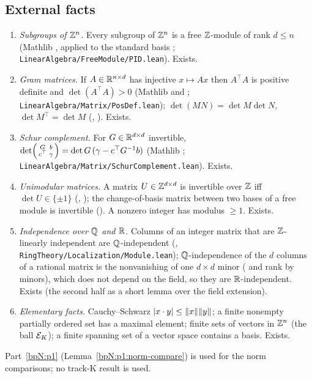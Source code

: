 \subsection{External facts}\label{bpN:p8:s-ext}
\begin{enumerate}[label=(E\arabic*),leftmargin=2.2em]
\item\label{bpN:p8:ext-free} \emph{Subgroups of $\mathbb{Z}^n$.} Every subgroup of $\mathbb{Z}^n$ is a free $\mathbb{Z}$-module of rank $d\le n$ (Mathlib , applied to the standard basis ; \texttt{LinearAlgebra/FreeModule/PID.lean}). Exists.
\item\label{bpN:p8:ext-gram} \emph{Gram matrices.} If $A\in\mathbb{R}^{n\times d}$ has injective $x\mapsto Ax$ then $A^\top A$ is positive definite and $\det(A^\top A)>0$ (Mathlib  and ; \texttt{LinearAlgebra/Matrix/PosDef.lean}); $\det(MN)=\det M\det N$, $\det M^\top=\det M$ (, ). Exists.
\item\label{bpN:p8:ext-schur} \emph{Schur complement.} For $G\in\mathbb{R}^{d\times d}$ invertible, $\det\begin{psmallmatrix}G&b\\c^\top&\gamma\end{psmallmatrix}=\det G\,(\gamma-c^\top G^{-1}b)$ (Mathlib ; \texttt{LinearAlgebra/Matrix/SchurComplement.lean}). Exists.
\item\label{bpN:p8:ext-units} \emph{Unimodular matrices.} A matrix $U\in\mathbb{Z}^{d\times d}$ is invertible over $\mathbb{Z}$ iff $\det U\in\{\pm1\}$ (, ); the change-of-basis matrix between two bases of a free module is invertible (). A nonzero integer has modulus $\ge1$. Exists.
\item\label{bpN:p8:ext-indep} \emph{Independence over $\mathbb Q$ and $\mathbb{R}$.} Columns of an integer matrix that are $\mathbb{Z}$-linearly independent are $\mathbb Q$-independent (, \texttt{RingTheory/Localization/Module.lean}); $\mathbb Q$-independence of the $d$ columns of a rational matrix is the nonvanishing of one $d\times d$ minor ( and rank by minors), which does not depend on the field, so they are $\mathbb{R}$-independent. Exists (the second half as a short lemma over the field extension).
\item\label{bpN:p8:ext-basic} \emph{Elementary facts.} Cauchy--Schwarz $\lvert x\cdot y\rvert\le\lVert x\rVert\lVert y\rVert$; a finite nonempty partially ordered set has a maximal element; finite sets of vectors in $\mathbb{Z}^n$ (the ball $\mathcal E_K$); a finite spanning set of a vector space contains a basis. Exists.
\end{enumerate}
Part~\ref{bpN:p1} (Lemma~\ref{bpN:p1:norm-compare}) is used for the norm comparisons; no track-K result is used.

